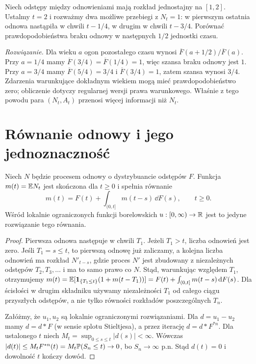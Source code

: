 \begin{zadanie}
Niech odstępy między odnowieniami mają rozkład jednostajny
na $[1,2]$. Ustalmy $t=2$ i rozważmy dwa możliwe przebiegi
z $N_t=1$: w pierwszym ostatnia odnowa nastąpiła w chwili
$t-1/4$, w drugim w chwili $t-3/4$. Porównać prawdopodobieństwa
braku odnowy w następnych $1/2$ jednostki czasu.

\emph{Rozwiązanie.} Dla wieku $a$ ogon pozostałego czasu
wynosi $\overline F(a+1/2)/\overline F(a)$.
Przy $a=1/4$ mamy $\overline F(3/4)=\overline F(1/4)=1$,
więc szansa braku odnowy jest $1$. Przy $a=3/4$ mamy
$\overline F(5/4)=3/4$ i $\overline F(3/4)=1$, zatem
szansa wynosi $3/4$. Zdarzenia warunkujące dokładnym
wiekiem mogą mieć prawdopodobieństwo zero; obliczenie
dotyczy regularnej wersji prawa warunkowego. Właśnie z tego
powodu para $(N_t,A_t)$ przenosi więcej informacji niż $N_t$.
\end{zadanie}

\section{Równanie odnowy i jego jednoznaczność}
\begin{twierdzenie}
Niech $N$ będzie procesem odnowy o dystrybuancie
odstępów $F$. Funkcja $m(t)=\mathbb{E} N_t$ jest skończona
dla $t\ge0$ i spełnia równanie
\[
m(t)=F(t)+\int_{(0,t]}m(t-s)\,\dd F(s),\qquad t\ge0.
\]
Wśród lokalnie ograniczonych funkcji borelowskich
$u:[0,\infty)\to\mathbb{R}$ jest to jedyne rozwiązanie tego równania.
\end{twierdzenie}
\begin{proof}
Pierwsza odnowa następuje w chwili $T_1$. Jeżeli $T_1>t$,
liczba odnowień jest zero. Jeśli $T_1=s\le t$,
to pierwszą odnowę już zaliczamy, a kolejna liczba
odnowień ma rozkład $N'_{t-s}$, gdzie proces $N'$ jest
zbudowany z niezależnych odstępów $T_2,T_3,\ldots$
i ma to samo prawo co $N$. Stąd, warunkując względem
$T_1$, otrzymujemy
$m(t)=\mathbb{E}[\mathbf{1}_{\{T_1\le t\}}(1+m(t-T_1))]
=F(t)+\int_{(0,t]}m(t-s)\,\mathrm{d} F(s)$.
Dla ścisłości w drugim składniku używamy niezależności
$T_1$ od całego ciągu przyszłych odstępów, a nie tylko
równości rozkładów poszczególnych $T_n$.

Załóżmy, że $u_1,u_2$ są lokalnie ograniczonymi rozwiązaniami.
Dla $d=u_1-u_2$ mamy $d=d*F$ (w sensie splotu
Stieltjesa), a przez iterację $d=d*F^{*n}$.
Dla ustalonego $t$ niech $M_t=\sup_{0\le s\le t}|d(s)|<\infty$.
Wówczas
$|d(t)|\le M_t F^{*n}(t)=M_t\mathbb{P}(S_n\le t)\to0$,
bo $S_n\to\infty$ p.n. Stąd $d(t)=0$ i dowolność $t$
kończy dowód.
\end{proof}

